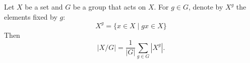 Let $X$ be a set and $G$ be a group that acts on $X$.
For $g \in G$, denote by $X^g$ the elements fixed by $g$:
\[
X^g = \{ x \in X \mid gx \in X \}
\]
Then
\[
|X/G| = \frac{1}{|G|} \sum_{g \in G} |X^g|.
\]
